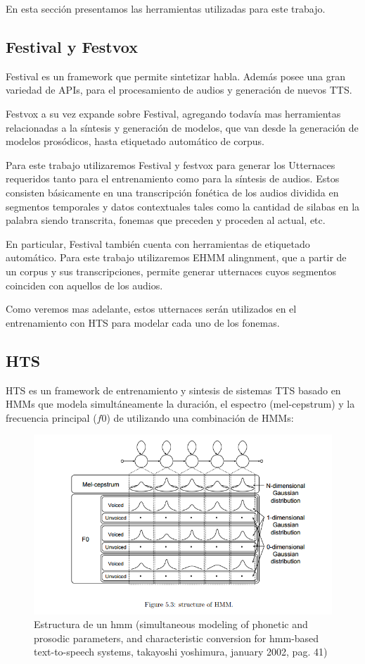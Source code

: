 En esta sección presentamos las herramientas utilizadas para este trabajo.

\subsection{Festival y Festvox}

Festival es un framework que permite sintetizar habla. Además posee una gran variedad de APIs, para el procesamiento de audios y generación de nuevos TTS.

Festvox a su vez expande sobre Festival, agregando todavía mas herramientas relacionadas a la síntesis y generación de modelos, que van desde la generación de modelos prosódicos, hasta etiquetado automático de corpus.

Para este trabajo utilizaremos Festival y festvox para generar los Utternaces requeridos tanto para el entrenamiento como para la síntesis de audios. Estos consisten básicamente en una transcripción fonética de los audios dividida en segmentos temporales y datos contextuales tales como la cantidad de silabas en la palabra siendo transcrita, fonemas que preceden y proceden al actual, etc.

En particular, Festival también cuenta con herramientas de etiquetado automático. Para este trabajo utilizaremos EHMM alingnment, que a partir de un corpus y sus transcripciones, permite generar utternaces cuyos segmentos coinciden con aquellos de los audios.

Como veremos mas adelante, estos utternaces serán utilizados en el entrenamiento con HTS para modelar cada uno de los fonemas.

\subsection{HTS}

HTS es un framework de entrenamiento y sintesis de sistemas TTS basado en HMMs que modela simultáneamente la duración, el espectro (mel-cepstrum) y la frecuencia principal ($f0$) de utilizando una combinación de HMMs:

\begin{figure}
\includegraphics[scale=0.5]{imagenes/hmm.png}
\caption{Estructura de un hmm (simultaneous modeling of phonetic and prosodic parameters, and characteristic conversion for hmm-based text-to-speech systems, takayoshi yoshimura, january 2002, pag. 41)}
\centering
\end{figure}

